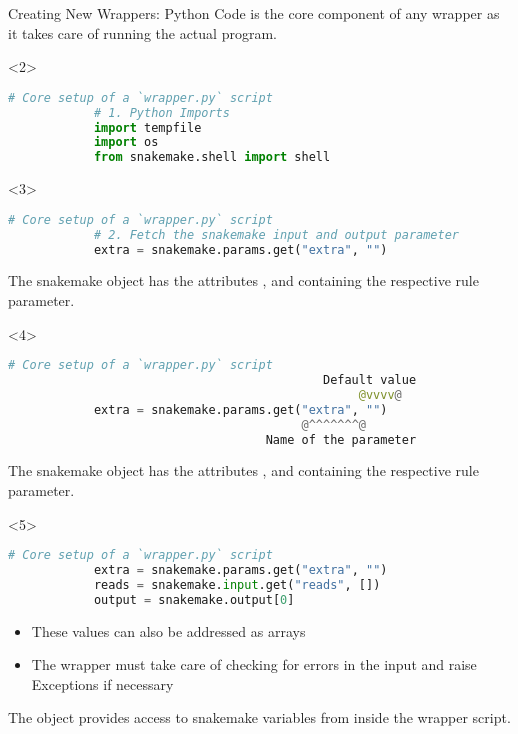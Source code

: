 \begin{frame}[fragile]{Creating New Wrappers: Python Code}
     is the core component of any wrapper as it takes care of running the actual
    program.
    \begin{onlyenv}<2>
        \begin{lstlisting}[language=Python,style=Python,gobble=12]
            # Core setup of a `wrapper.py` script
            # 1. Python Imports
            import tempfile
            import os
            from snakemake.shell import shell
        \end{lstlisting}
    \end{onlyenv}
    \begin{onlyenv}<3>
        \begin{lstlisting}[language=Python,style=Python,gobble=12]
            # Core setup of a `wrapper.py` script
            # 2. Fetch the snakemake input and output parameter
            extra = snakemake.params.get("extra", "")
        \end{lstlisting}
        The snakemake object has the attributes ,  and 
        containing the respective rule parameter.
    \end{onlyenv}
    \begin{onlyenv}<4>
        \begin{lstlisting}[language=Python,style=Python,gobble=12]
            # Core setup of a `wrapper.py` script
                                            Default value
                                                 @vvvv@
            extra = snakemake.params.get("extra", "")
                                         @^^^^^^^@
                                    Name of the parameter
        \end{lstlisting}
        The snakemake object has the attributes ,  and 
        containing the respective rule parameter.
    \end{onlyenv}
    \begin{onlyenv}<5>
        \begin{lstlisting}[language=Python,style=Python,gobble=12]
            # Core setup of a `wrapper.py` script
            extra = snakemake.params.get("extra", "")
            reads = snakemake.input.get("reads", [])
            output = snakemake.output[0]
        \end{lstlisting}
        \begin{itemize}
            \item These values can also be addressed as arrays
            \item The wrapper must take care of checking for errors in the input and raise Exceptions if necessary
        \end{itemize}
    \end{onlyenv}
    \begin{hint}
        The  object provides access to snakemake variables from inside the
        wrapper script.
    \end{hint}
\end{frame}

